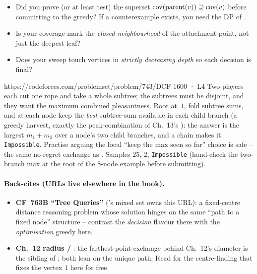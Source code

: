 \begin{stuckbox}
\begin{itemize}[nosep, leftmargin=1.4em]
  \item Did you prove (or at least test) the superset $\mathrm{cov}(\operatorname{parent}(v))
        \supseteq \mathrm{cov}(v)$ before committing to the greedy? If a counterexample
        exists, you need the DP of .
  \item Is your coverage mark the \emph{closed neighbourhood} of the attachment point,
        not just the deepest leaf?
  \item Does your sweep touch vertices in \emph{strictly decreasing depth} so each
        decision is final?
\end{itemize}
\end{stuckbox}

\begin{practiceset}
    {https://codeforces.com/problemset/problem/743/D}{CF 1600 · L4}
    {Two players each cut one rope and take a whole subtree; the subtrees must be
    disjoint, and they want the maximum combined pleasantness. Root at~$1$, fold
    subtree sums, and at each node keep the \emph{best} subtree-sum available in
    each child branch (a greedy harvest, exactly the peak-combination of Ch.~13's
    ): the answer is the largest $m_1+m_2$ over a node's two
    child branches, and a chain makes it \texttt{Impossible}. Practise arguing the
    local ``keep the max seen so far'' choice is safe -- the same no-regret exchange
    as . Samples $25$, $2$, \texttt{Impossible} (hand-check
    the two-branch max at the root of the $8$-node example before submitting).}
\end{practiceset}

\paragraph{Back-cites (URLs live elsewhere in the book).}
\begin{itemize}[nosep,leftmargin=1.4em]
  \item \textbf{CF~763B ``Tree Queries''} ('s mixed set owns this URL):
        a fixed-centre distance reasoning problem whose
        solution hinges on the same ``path to a fixed node'' structure -- contrast
        the \emph{decision} flavour there with the \emph{optimisation} greedy here.
  \item \textbf{Ch.~12 radius / }: the farthest-point-exchange
        behind Ch.~12's diameter is the sibling of ; both lean on
        the unique path. Read  for the centre-finding that fixes the
        vertex $1$ here for free.
\end{itemize}

